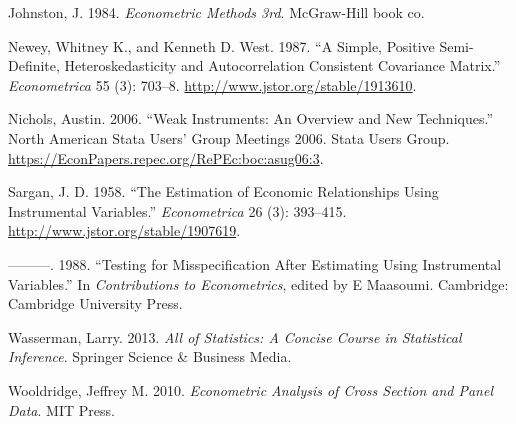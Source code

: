\documentclass[
  12pt,
]{article}
\newlength{\cslhangindent}
\newenvironment{cslreferences}%
  {\setlength{\parindent}{0pt}%
  \everypar{\setlength{\hangindent}{\cslhangindent}}\ignorespaces}%
  {\par}
\begin{document}
\begin{cslreferences}
\leavevmode\hypertarget{ref-johnston1984econometric}{}%
Johnston, J. 1984. \emph{Econometric Methods 3rd}. McGraw-Hill book co.

\leavevmode\hypertarget{ref-NWe}{}%
Newey, Whitney K., and Kenneth D. West. 1987. ``A Simple, Positive Semi-Definite, Heteroskedasticity and Autocorrelation Consistent Covariance Matrix.'' \emph{Econometrica} 55 (3): 703--8. \url{http://www.jstor.org/stable/1913610}.

\leavevmode\hypertarget{ref-WeakIV}{}%
Nichols, Austin. 2006. ``Weak Instruments: An Overview and New Techniques.'' North American Stata Users' Group Meetings 2006. Stata Users Group. \url{https://EconPapers.repec.org/RePEc:boc:asug06:3}.

\leavevmode\hypertarget{ref-Sargan1958}{}%
Sargan, J. D. 1958. ``The Estimation of Economic Relationships Using Instrumental Variables.'' \emph{Econometrica} 26 (3): 393--415. \url{http://www.jstor.org/stable/1907619}.

\leavevmode\hypertarget{ref-Sargan1988}{}%
---------. 1988. ``Testing for Misspecification After Estimating Using Instrumental Variables.'' In \emph{Contributions to Econometrics}, edited by E Maasoumi. Cambridge: Cambridge University Press.

\leavevmode\hypertarget{ref-wasserman2013all}{}%
Wasserman, Larry. 2013. \emph{All of Statistics: A Concise Course in Statistical Inference}. Springer Science \& Business Media.

\leavevmode\hypertarget{ref-JMW10}{}%
Wooldridge, Jeffrey M. 2010. \emph{Econometric Analysis of Cross Section and Panel Data}. MIT Press.
\end{cslreferences}
\end{document}
